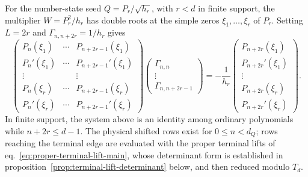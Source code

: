 \documentclass[a4paper,11pt]{article}
\theoremstyle{definition}
\theoremstyle{remark}
\begin{document}
For the number-state seed $Q=P_r/\sqrt{h_r}$, with $r<d$ in finite support, the multiplier $W=P_r^2/h_r$ has double roots at the simple zeros $\xi_1,\ldots,\xi_r$ of $P_r$. Setting $L=2r$ and $\Gamma_{n,n+2r}=1/h_r$ gives
\begin{equation}
\begin{pmatrix}
P_n(\xi_1)&\cdots&P_{n+2r-1}(\xi_1)\\
P_n'(\xi_1)&\cdots&P_{n+2r-1}'(\xi_1)\\
\vdots&&\vdots\\
P_n(\xi_r)&\cdots&P_{n+2r-1}(\xi_r)\\
P_n'(\xi_r)&\cdots&P_{n+2r-1}'(\xi_r)
\end{pmatrix}
\begin{pmatrix}
\Gamma_{n,n}\\
\vdots\\
\Gamma_{n,n+2r-1}
\end{pmatrix}
=-\frac{1}{h_r}
\begin{pmatrix}
P_{n+2r}(\xi_1)\\ P_{n+2r}'(\xi_1)\\ \vdots\\
P_{n+2r}(\xi_r)\\ P_{n+2r}'(\xi_r)
\end{pmatrix}.
\label{eq:general-root-system}
\end{equation}
In finite support, the system above is an identity among ordinary polynomials while $n+2r\le d-1$. The physical shifted rows exist for $0\le n<d_Q$; rows reaching the terminal edge are evaluated with the proper terminal lifts of eq.~\eqref{eq:proper-terminal-lift-main}, whose determinant form is established in proposition~\ref{prop:terminal-lift-determinant} below, and then reduced modulo $T_d$.
\end{document}
